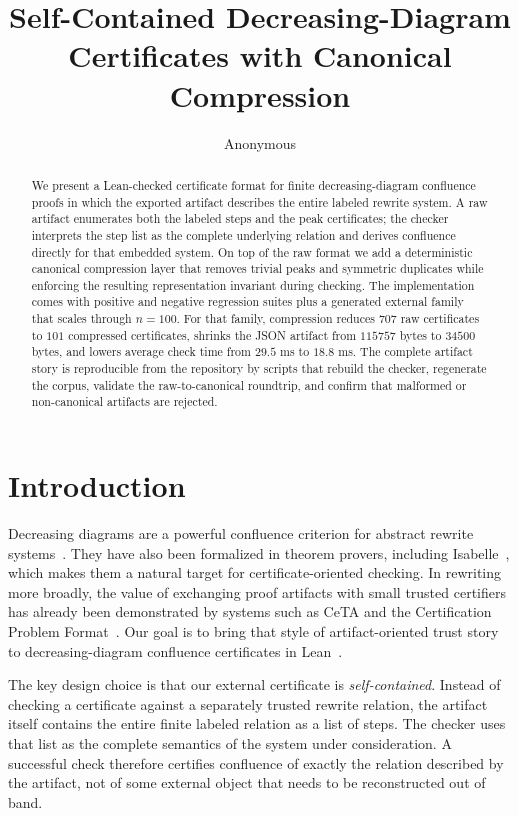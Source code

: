 \documentclass[submission,copyright,creativecommons]{eptcs}
\title{Self-Contained Decreasing-Diagram Certificates with Canonical Compression}
\author{Anonymous
\institute{Anonymous Institution}
\email{email@example.org}
}
\newcommand{\lean}{Lean\xspace}
\begin{document}
\maketitle

\begin{abstract}
We present a \lean-checked certificate format for finite decreasing-diagram
confluence proofs in which the exported artifact describes the entire
labeled rewrite system. A raw artifact enumerates both the labeled steps and
the peak certificates; the checker interprets the step list as the complete
underlying relation and derives confluence directly for that embedded system.
On top of the raw format we add a deterministic canonical compression layer
that removes trivial peaks and symmetric duplicates while enforcing the
resulting representation invariant during checking. The implementation comes
with positive and negative regression suites plus a generated external family
that scales through $n = 100$. For that family, compression reduces $707$
raw certificates to $101$ compressed certificates, shrinks the JSON artifact
from $115757$ bytes to $34500$ bytes, and lowers average check time from
$29.5$ ms to $18.8$ ms. The complete artifact story is reproducible from the
repository by scripts that rebuild the checker, regenerate the corpus, validate
the raw-to-canonical roundtrip, and confirm that malformed or non-canonical
artifacts are rejected.
\end{abstract}

\section{Introduction}

Decreasing diagrams are a powerful confluence criterion for abstract rewrite
systems~\cite{vanOostrom1994}. They have also been formalized in theorem
provers, including Isabelle~\cite{zankl2013}, which makes them a natural
target for certificate-oriented checking. In rewriting more broadly, the value
of exchanging proof artifacts with small trusted certifiers has already been
demonstrated by systems such as CeTA and the Certification Problem
Format~\cite{thiemann2009,sternagel2014}. Our goal is to bring that style of
artifact-oriented trust story to decreasing-diagram confluence certificates in
\lean~\cite{demoura2015}.

The key design choice is that our external certificate is \emph{self-contained}.
Instead of checking a certificate against a separately trusted rewrite relation,
the artifact itself contains the entire finite labeled relation as a list of
steps. The checker uses that list as the complete semantics of the system under
consideration. A successful check therefore certifies confluence of exactly the
relation described by the artifact, not of some external object that needs to
be reconstructed out of band.
\end{document}
